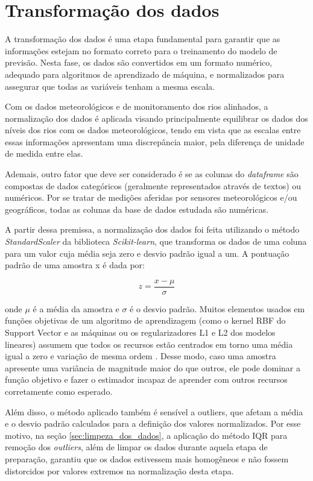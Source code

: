 \section{Transformação dos dados}

A transformação dos dados é uma etapa fundamental para garantir que as informações estejam no formato correto para o treinamento do modelo de previsão. Nesta fase, os dados são convertidos em um formato numérico, adequado para algoritmos de aprendizado de máquina, e normalizados para assegurar que todas as variáveis tenham a mesma escala.

Com os dados meteorológicos e de monitoramento dos rios alinhados, a normalização dos dados é aplicada visando principalmente equilibrar os dados dos níveis dos rios com os dados meteorológicos, tendo em vista que as escalas entre essas informações apresentam uma discrepância maior, pela diferença de unidade de medida entre elas.

Ademais, outro fator que deve ser considerado é se as colunas do \textit{dataframe} são compostas de dados categóricos (geralmente representados através de textos) ou numéricos. Por se tratar de medições aferidas por sensores meteorológicos e/ou geográficos, todas as colunas da base de dados estudada são numéricas.

A partir dessa premissa, a normalização dos dados foi feita utilizando o método \textit{StandardScaler} da biblioteca \textit{Scikit-learn}, que transforma os dados de uma coluna para um valor cuja média seja zero e desvio padrão igual a um. A pontuação padrão de uma amostra x é dada por:

\begin{equation}
z = \frac{x - \mu}{\sigma}
\end{equation}

onde \( \mu \) é a média da amostra e \( \sigma \) é o desvio padrão. Muitos elementos usados em funções objetivas de um algoritmo de aprendizagem (como o kernel RBF do Support Vector e as máquinas ou os regularizadores L1 e L2 dos modelos lineares) assumem que todos os recursos estão centrados em torno uma média igual a zero e variação de mesma ordem \cite{scikit_learn_standardscaler}. Desse modo, caso uma amostra apresente uma variância de magnitude maior do que outros, ele pode dominar a função objetivo e fazer o estimador incapaz de aprender com outros recursos corretamente como esperado.

Além disso, o método aplicado também é sensível a outliers, que afetam a média e o desvio padrão calculados para a definição dos valores normalizados. Por esse motivo, na seção \ref{sec:limpeza_dos_dados}, a aplicação do método IQR para remoção dos \textit{outliers}, além de limpar os dados durante aquela etapa de preparação, garantiu que os dados estivessem mais homogêneos e não fossem distorcidos por valores extremos na normalização desta etapa.

